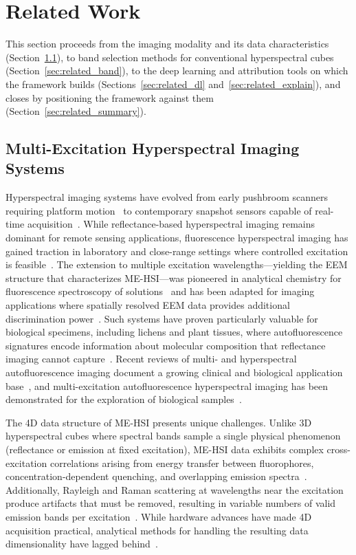 \section{Related Work}
\label{sec:related_work}

This section proceeds from the imaging modality and its data characteristics (Section~\ref{sec:related_hsi}), to band selection methods for conventional hyperspectral cubes (Section~\ref{sec:related_band}), to the deep learning and attribution tools on which the framework builds (Sections~\ref{sec:related_dl} and~\ref{sec:related_explain}), and closes by positioning the framework against them (Section~\ref{sec:related_summary}).

\subsection{Multi-Excitation Hyperspectral Imaging Systems}
\label{sec:related_hsi}

Hyperspectral imaging systems have evolved from early pushbroom scanners requiring platform motion~\cite{goetz1985imaging} to contemporary snapshot sensors capable of real-time acquisition~\cite{hagen2013review}.
While reflectance-based hyperspectral imaging remains dominant for remote sensing applications, fluorescence hyperspectral imaging has gained traction in laboratory and close-range settings where controlled excitation is feasible~\cite{mishra2017close}.
The extension to multiple excitation wavelengths---yielding the EEM structure that characterizes ME-HSI---was pioneered in analytical chemistry for fluorescence spectroscopy of solutions~\cite{murphy2013fluorescence} and has been adapted for imaging applications where spatially resolved EEM data provides additional discrimination power~\cite{lavine2001exploratory}.
Such systems have proven particularly valuable for biological specimens, including lichens and plant tissues, where autofluorescence signatures encode information about molecular composition that reflectance imaging cannot capture~\cite{croce2019autofluorescence}.
Recent reviews of multi- and hyperspectral autofluorescence imaging document a growing clinical and biological application base~\cite{campbell2023beyondoncology}, and multi-excitation autofluorescence hyperspectral imaging has been demonstrated for the exploration of biological samples~\cite{ghaffari2019multiexcitation}.

The 4D data structure of ME-HSI presents unique challenges.
Unlike 3D hyperspectral cubes where spectral bands sample a single physical phenomenon (reflectance or emission at fixed excitation), ME-HSI data exhibits complex cross-excitation correlations arising from energy transfer between fluorophores, concentration-dependent quenching, and overlapping emission spectra~\cite{lakowicz2006principles}.
Additionally, Rayleigh and Raman scattering at wavelengths near the excitation produce artifacts that must be removed, resulting in variable numbers of valid emission bands per excitation~\cite{murphy2013fluorescence}.
While hardware advances have made 4D acquisition practical, analytical methods for handling the resulting data dimensionality have lagged behind~\cite{mishra2017close}.

